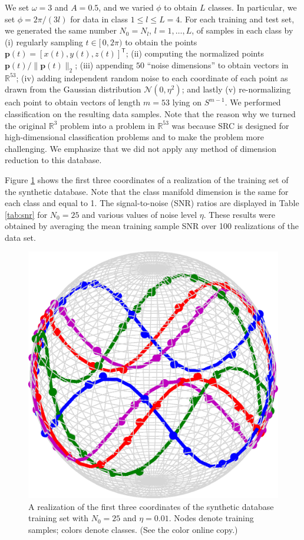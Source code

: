 \documentclass[review]{elsarticle}
\newcommand{\transp}{\mathsf{T}}
\begin{document}
We set $\omega = 3$ and $A = 0.5$, and we varied $\phi$ to obtain $L$ classes. In particular, we set $\phi = 2 \pi/(3l)$ for data in class $1\leq l \leq L=4$. For each training and test set, we generated the same number $N_0 = N_l$, $l=1,\ldots,L$, of samples in each class by (i) regularly sampling $t \in [\,0,2\pi)$ to obtain the points $\bm{p}(t) = [x(t),y(t),z(t)]^\transp$; (ii) computing the normalized points $\bm{p}(t)/\|\bm{p}(t)\|_2$; (iii) appending $50$ ``noise dimensions'' to obtain vectors in $\mathbb{R}^{53}$; (iv) adding independent random noise to each coordinate of each point as drawn from the Gaussian distribution $\mathcal{N}(0,\eta^2)$; and lastly (v) re-normalizing each point to obtain vectors of length $ m = 53$ lying on $S^{m-1}$. We performed classification on the resulting data samples. Note that the reason why we turned the original $\mathbb{R}^3$ problem into a problem in $\mathbb{R}^{53}$ was because SRC is designed for high-dimensional classification problems \cite{wri:src} and to make the problem more challenging. We emphasize that we did not apply any method of dimension reduction to this database.

Figure \ref{syn_data_set} shows the first three coordinates of a realization of the training set of the synthetic database. Note that the class manifold dimension is the same for each class and equal to 1. The signal-to-noise (SNR) ratios are displayed in Table \ref{tab:snr} for $N_0 = 25$ and various values of noise level $\eta$. These results were obtained by averaging the mean training sample SNR over 100 realizations of the data set. 
 


\begin{figure}[t]
\begin{center}
\includegraphics[width=0.3\linewidth]{Fig_1}
\caption{A realization of the first three coordinates of the synthetic database training set with $N_0 = 25$ and $\eta = 0.01$. Nodes denote training samples; colors denote classes. (See the color online copy.) }
\label{syn_data_set}
\end{center}
\end{figure}
\end{document}
